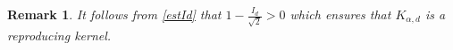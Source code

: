 \documentclass[12pt]{article}
\newtheorem{remark}{Remark}
\begin{document}
\begin{appendix}
\begin{remark}\rm 
It follows from \eqref{estId} that $1 - \tfrac{I_d}{\sqrt{2}} > 0$ which ensures that $K_{\alpha,d}$ is a reproducing kernel.
\end{remark}

\fi 

\end{appendix}
\end{document}
